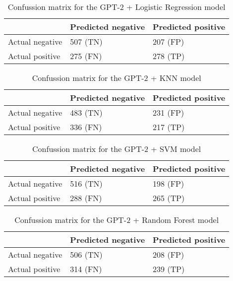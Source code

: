 
\begin{table}[!htbp]
\centering
{
\makegapedcells
\begin{tabular}{lll}
                & Predicted negative & Predicted positive \\
\hline
Actual negative & 507 (TN)           & 207 (FP) \\
Actual positive & 275 (FN)           & 278 (TP) \\
\hline
\end{tabular}
}
\caption{Confussion matrix for the GPT-2 + Logistic Regression model}
\label{gpt2lr_cm}
\end{table}

\begin{table}[!htbp]
\centering
{
\makegapedcells
\begin{tabular}{lll}
                & Predicted negative & Predicted positive \\
\hline
Actual negative & 483 (TN)           & 231 (FP) \\
Actual positive & 336 (FN)           & 217 (TP) \\
\hline
\end{tabular}
}
\caption{Confussion matrix for the GPT-2 + KNN model}
\label{gpt2knn_cm}
\end{table}

\begin{table}[!htbp]
\centering
{
\makegapedcells
\begin{tabular}{lll}
                & Predicted negative & Predicted positive \\
\hline
Actual negative & 516 (TN)           & 198 (FP) \\
Actual positive & 288 (FN)           & 265 (TP) \\
\hline
\end{tabular}
}
\caption{Confussion matrix for the GPT-2 + SVM model}
\label{gpt2svm_cm}
\end{table}

\begin{table}[!htbp]
\centering
{
\makegapedcells
\begin{tabular}{lll}
                & Predicted negative & Predicted positive \\
\hline
Actual negative & 506 (TN)           & 208 (FP) \\
Actual positive & 314 (FN)           & 239 (TP) \\
\hline
\end{tabular}
}
\caption{Confussion matrix for the GPT-2 + Random Forest model}
\label{gpt2rf_cm}
\end{table}

